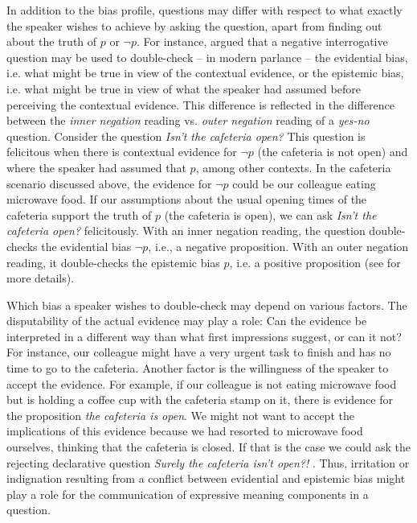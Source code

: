 \documentclass[output=paper,colorlinks,citecolor=brown]{langscibook}
\begin{document}
In addition to the bias profile, questions may differ with respect to what exactly the speaker wishes to achieve by asking the question, apart from finding out about the truth of $p$ or $\neg p$. For instance, \citet{Ladd1981} argued that a negative interrogative question may be used to double-check – in modern parlance – the evidential bias, i.e. what might be true in view of the contextual evidence, or the epistemic bias, i.e. what might be true in view of what the speaker had assumed before perceiving the contextual evidence. This difference is reflected in the difference between the \textit{inner negation} reading vs. \textit{outer negation} reading of a \textit{yes-no} question. Consider the question \textit{Isn't the cafeteria open?} This question is felicitous when there is contextual evidence for $\neg p$ (the cafeteria is not open) and where the speaker had assumed that $p$, among other contexts. In the cafeteria scenario discussed above, the evidence for $\neg p$ could be our colleague eating microwave food. If our assumptions about the usual opening times of the cafeteria support the truth of $p$ (the cafeteria is open), we can ask \textit{Isn't the cafeteria open?} felicitously. With an inner negation reading, the question double-checks the evidential bias $\neg p$, i.e., a negative proposition. With an outer negation reading, it double-checks the epistemic bias $p$, i.e. a positive proposition (see  for more details).

Which bias a speaker wishes to double-check may depend on various factors. The disputability of the actual evidence may play a role: Can the evidence be interpreted in a different way than what first impressions suggest, or can it not? For instance, our colleague might have a very urgent task to finish and has no time to go to the cafeteria. Another factor is the willingness of the speaker to accept the evidence. For example, if our colleague is not eating microwave food but is holding a coffee cup with the cafeteria stamp on it, there is evidence for the proposition \textit{the cafeteria is open}. We might not want to accept the implications of this evidence because we had resorted to microwave food ourselves, thinking that the cafeteria is closed. If that is the case we could ask the rejecting declarative question \textit{Surely the cafeteria isn't open?!} \citep{Seeliger15, Seeliger2019Swedish, Seeliger18}. Thus, irritation or indignation resulting from a conflict between evidential and epistemic bias might play a role for the communication of expressive meaning components in a question.
\end{document}

